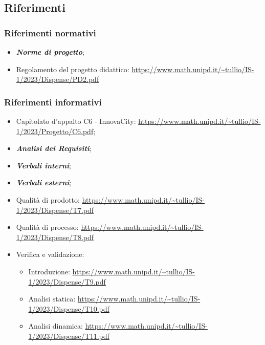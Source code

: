 \subsection{Riferimenti}
\subsubsection{Riferimenti normativi}
\begin{itemize}
    \item \textbf{\textit{Norme di progetto}};
    \item Regolamento del progetto didattico: \url{https://www.math.unipd.it/~tullio/IS-1/2023/Dispense/PD2.pdf}
\end{itemize}
\subsubsection{Riferimenti informativi}
\begin{itemize}
    \item Capitolato d’appalto C6 - InnovaCity: \url{https://www.math.unipd.it/~tullio/IS-1/2023/Progetto/C6.pdf};
    \item \textbf{\textit{Analisi dei Requisiti}};
    \item \textbf{\textit{Verbali interni}};
    \item \textbf{\textit{Verbali esterni}};
    \item Qualità di prodotto: \url{https://www.math.unipd.it/~tullio/IS-1/2023/Dispense/T7.pdf}
    \item Qualità di processo: \url{https://www.math.unipd.it/~tullio/IS-1/2023/Dispense/T8.pdf}
    \item Verifica e validazione: \begin{itemize}
    \item Introduzione: \url{https://www.math.unipd.it/~tullio/IS-1/2023/Dispense/T9.pdf}
    \item Analisi statica: \url{https://www.math.unipd.it/~tullio/IS-1/2023/Dispense/T10.pdf}
    \item Analisi dinamica: \url{https://www.math.unipd.it/~tullio/IS-1/2023/Dispense/T11.pdf}
\end{itemize}
\end{itemize}
